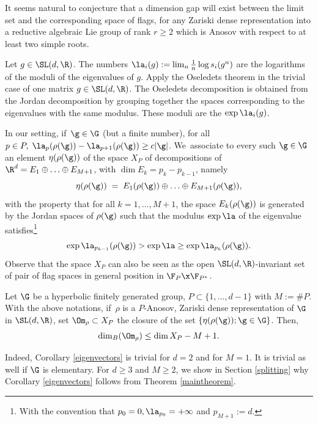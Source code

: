 It seems natural to conjecture that a dimension gap will exist between the limit set and the corresponding space of flags, for any Zariski dense representation into a reductive algebraic Lie group of rank \(r \ge 2\) which is Anosov with respect to at least two simple roots.

Let \(g\in \SL(d,\R)\). The numbers \(\la_i (g) := \lim_n \frac{1}{n }\log s_i(g^n) \) are the logarithms of the moduli of the eigenvalues of \(g\). Apply the Oseledets theorem in the trivial case of one matrix
\(g \in \SL (d,\R)\). The Oseledets decomposition is obtained from the Jordan decomposition by grouping together the spaces corresponding to the eigenvalues with the same modulus. These moduli are the \(\exp \la_i (g)\).

In our setting, if~\(\g \in \G\) (but a finite number), for all \(p \in P, \; \la_p (\rho(\g)) -\la_{p+1}(\rho(\g)) \geq c |\g| \). We~associate to every such \(\g \in \G \) an element \(\eta (\rho (\g))\) of the space \(X_P\) of decompositions of \(\R^d = E_1 \oplus \ldots \oplus E_{M+1} \), with \(\dim E_k = p_k- p_{k-1}\), namely
\[
 \eta (\rho (\g)) \; = \; E_1(\rho (\g)) \oplus \ldots \oplus E_{M+1} (\rho (\g)), 
\]
with the property that for all \(k = 1, \ldots, M+1\), the space \(E_{k} (\rho (\g)) \) is generated by the Jordan spaces of \(\rho(\g)\) such that the modulus \(\exp \la\) of the eigenvalue satisfies\footnote{With the convention that \(p_0=0, \la_{p_0} =+\infty\) and \(p_{M+1}:= d\).}
\[
\exp \la_{p_{k-1}}(\rho (\g)) >\exp \la \ge \exp \la_{p_{k}}(\rho (\g)).
\]
Observe that the space \(X_P\) can also be seen as the open \(\SL (d,\R) \)-invariant set of pair of flag spaces in general position in \(\F_P \x \F_{P^\ast} \).

\begin{corollary}\label{eigenvectors} Let \(\G\) be a hyperbolic finitely generated group, \hbox{\(P \!\subset\! \lbrace 1,\ldots, d-1 \rbrace\)} with \(M:= \# P \).
With the above notations, if~\(\rho \) is a \(P\)-Anosov, Zariski dense representation of \(\G\) in \(\SL(d,\R) \), set \(\Om_\rho \subset X_P \) the closure of the set \(\{ \eta (\rho (\g)); \g \in \G\}\). Then,
\[
\dim_B(\Om_\rho) \le \dim X_P -M +1.
\]
\end{corollary}

Indeed, Corollary \ref{eigenvectors} is trivial for \(d= 2\) and for \(M=1\). It is trivial as well if \(\G\) is elementary. For \(d \ge 3\) and \(M\ge 2\), we show in Section \ref{splitting} why Corollary \ref{eigenvectors} follows from Theorem \ref{maintheorem}.

